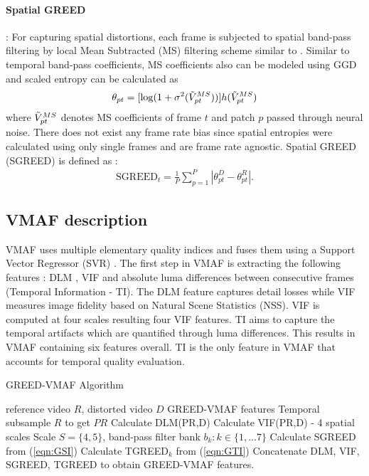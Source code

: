 \documentclass[conference]{IEEEtran}
\begin{document}
\paragraph*{\textbf{Spatial GREED}}: For capturing spatial distortions, each frame is subjected to spatial band-pass filtering by local Mean Subtracted (MS) filtering scheme similar to \cite{bampis2017speed}. Similar to temporal band-pass coefficients, MS coefficients also can be modeled using GGD and scaled entropy can be calculated as
\begin{align*}
    \theta_{pt} =  [\log(1+\sigma^2(\Tilde{V}_{pt}^{MS}))] h(\Tilde{V}_{pt}^{MS})
\end{align*}
where $\Tilde{V}_{pt}^{MS}$ denotes MS coefficients of frame $t$ and patch $p$ passed through neural noise. There does not exist any frame rate bias since spatial entropies were calculated using only single frames and are frame rate agnostic. Spatial GREED (SGREED) is defined as :
\begin{align}
    \text{SGREED}_t = \frac{1}{P}\sum_{p=1} ^P |\theta_{pt} ^D - \theta_{pt} ^R|.
    \label{eqn:GSI}
\end{align}

\subsection{VMAF description}
VMAF uses multiple elementary quality indices and fuses them using a Support Vector Regressor (SVR) \cite{VMAF2016}. The first step in VMAF is extracting the following features : DLM \cite{li2011image}, VIF \cite{sheikh2006image} and absolute luma differences between consecutive frames (Temporal Information - TI). The DLM feature captures detail losses while VIF measures image fidelity based on Natural Scene Statistics (NSS). VIF is computed at four scales resulting four VIF features. TI aims to capture the temporal artifacts which are quantified through luma differences. This results in VMAF containing six features overall. TI is the only feature in VMAF that accounts for temporal quality evaluation.

\begin{algorithm}[t] \caption{GREED-VMAF Algorithm}
\begin{algorithmic}[1]
\Require reference video $R$, distorted video $D$
\Ensure GREED-VMAF features
\State Temporal subsample $R$ to get $PR$
\State Calculate DLM(PR,D)
\State Calculate VIF(PR,D) - 4 spatial scales
\State Scale $S = \{4,5\}$, band-pass filter bank $b_k: k \in \{1,\ldots 7\}$
\State Calculate SGREED from (\ref{eqn:GSI})
\State Calculate TGREED$_k$ from (\ref{eqn:GTI})
\EndFor
\EndFor
\State Concatenate DLM, VIF, SGREED, TGREED to obtain GREED-VMAF features.
\end{algorithmic}
\label{alg1}
\end{algorithm}
\end{document}
